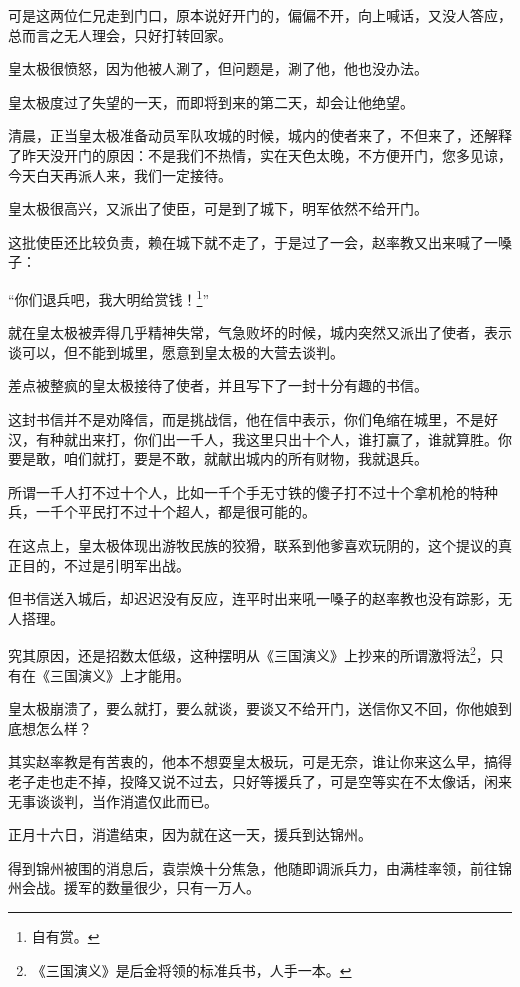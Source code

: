 \begin{multicols}{\theparacolNo}
		可是这两位仁兄走到门口，原本说好开门的，偏偏不开，向上喊话，又没人答应，总而言之无人理会，只好打转回家。

		皇太极很愤怒，因为他被人涮了，但问题是，涮了他，他也没办法。

		皇太极度过了失望的一天，而即将到来的第二天，却会让他绝望。

		清晨，正当皇太极准备动员军队攻城的时候，城内的使者来了，不但来了，还解释了昨天没开门的原因：不是我们不热情，实在天色太晚，不方便开门，您多见谅，今天白天再派人来，我们一定接待。

		皇太极很高兴，又派出了使臣，可是到了城下，明军依然不给开门。

		这批使臣还比较负责，赖在城下就不走了，于是过了一会，赵率教又出来喊了一嗓子：

		“你们退兵吧，我大明给赏钱！\footnote{自有赏。}”

		就在皇太极被弄得几乎精神失常，气急败坏的时候，城内突然又派出了使者，表示谈可以，但不能到城里，愿意到皇太极的大营去谈判。

		差点被整疯的皇太极接待了使者，并且写下了一封十分有趣的书信。

		这封书信并不是劝降信，而是挑战信，他在信中表示，你们龟缩在城里，不是好汉，有种就出来打，你们出一千人，我这里只出十个人，谁打赢了，谁就算胜。你要是敢，咱们就打，要是不敢，就献出城内的所有财物，我就退兵。

		所谓一千人打不过十个人，比如一千个手无寸铁的傻子打不过十个拿机枪的特种兵，一千个平民打不过十个超人，都是很可能的。

		在这点上，皇太极体现出游牧民族的狡猾，联系到他爹喜欢玩阴的，这个提议的真正目的，不过是引明军出战。

		但书信送入城后，却迟迟没有反应，连平时出来吼一嗓子的赵率教也没有踪影，无人搭理。

		究其原因，还是招数太低级，这种摆明从《三国演义》上抄来的所谓激将法\footnote{《三国演义》是后金将领的标准兵书，人手一本。}，只有在《三国演义》上才能用。

		皇太极崩溃了，要么就打，要么就谈，要谈又不给开门，送信你又不回，你他娘到底想怎么样？

		其实赵率教是有苦衷的，他本不想耍皇太极玩，可是无奈，谁让你来这么早，搞得老子走也走不掉，投降又说不过去，只好等援兵了，可是空等实在不太像话，闲来无事谈谈判，当作消遣仅此而已。

		正月十六日，消遣结束，因为就在这一天，援兵到达锦州。

		得到锦州被围的消息后，袁崇焕十分焦急，他随即调派兵力，由满桂率领，前往锦州会战。援军的数量很少，只有一万人。


\end{multicols}
